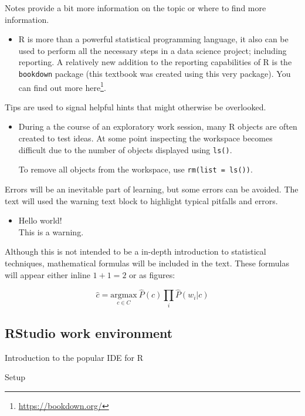 \documentclass[]{book}
\renewcommand{\href}[2]{#2\footnote{\url{#1}}}
\let\rmarkdownfootnote\footnote%
\def\footnote{\protect\rmarkdownfootnote}
\newenvironment{rmdblock}[1]
  {\begin{shaded*}
  \begin{itemize}
  \renewcommand{\labelitemi}{
    \raisebox{-.5\height}[0pt][0pt]{
      {\setkeys{Gin}{width=2em,keepaspectratio}\texttt{[image: images/\#1]}}
    }
  }
  \item
  }
  {
  \end{itemize}
  \end{shaded*}
  }
\newenvironment{rmdnote}
  {\begin{rmdblock}{note}}
  {\end{rmdblock}}
\newenvironment{rmdtip}
  {\begin{rmdblock}{tip}}
  {\end{rmdblock}}
\newenvironment{rmdwarning}
  {\begin{rmdblock}{warning}}
  {\end{rmdblock}}
\begin{document}
Notes provide a bit more information on the topic or where to find more information.

\begin{rmdnote}
R is more than a powerful statistical programming language, it also can
be used to perform all the necessary steps in a data science project;
including reporting. A relatively new addition to the reporting
capabilities of R is the \texttt{bookdown} package (this textbook was
created using this very package). You can find out more
\href{https://bookdown.org/}{here}.
\end{rmdnote}

Tips are used to signal helpful hints that might otherwise be overlooked.

\begin{rmdtip}
During a the course of an exploratory work session, many R objects are
often created to test ideas. At some point inspecting the workspace
becomes difficult due to the number of objects displayed using
\texttt{ls()}.

To remove all objects from the workspace, use
\texttt{rm(list\ =\ ls())}.
\end{rmdtip}

Errors will be an inevitable part of learning, but some errors can be avoided. The text will used the warning text block to highlight typical pitfalls and errors.

\begin{rmdwarning}
Hello world!\\
This is a warning.
\end{rmdwarning}

Although this is not intended to be a in-depth introduction to statistical techniques, mathematical formulas will be included in the text. These formulas will appear either inline \(1 + 1 = 2\) or as figures:

\begin{equation}
  \hat{c} = \underset{c \in C} {\mathrm{argmax}} ~\hat{P}(c) \prod_i \hat{P}(w_i|c)
  \label{eq:example-formula}
\end{equation}

\hypertarget{rstudio-work-environment}{%
\subsection{RStudio work environment}\label{rstudio-work-environment}}

Introduction to the popular IDE for R

Setup
\end{document}
